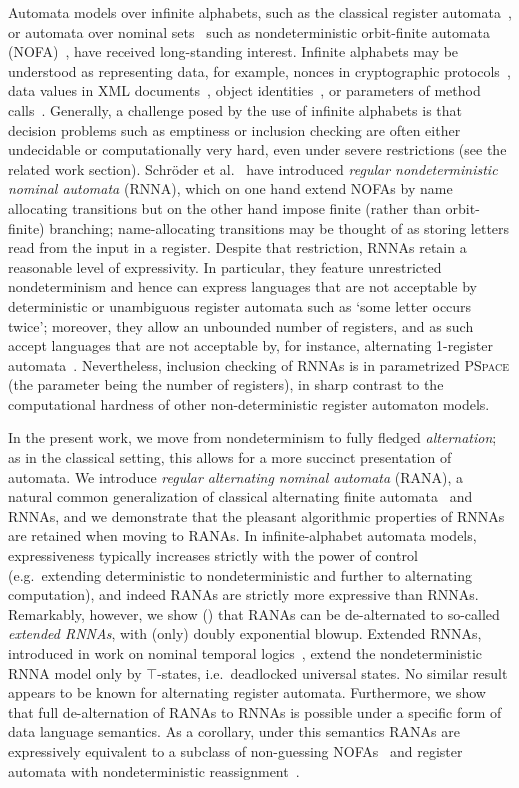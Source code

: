 \documentclass[10pt, final, conference, a4paper, twocolumn]{IEEEtran}
\newcommand{\PSPACE}{\textsc{PSpace}\xspace}
\begin{document}
Automata models over infinite alphabets, such as the classical register
automata~\cite{KaminskiFrancez94}, or automata over nominal sets~\cite{Pitts2013} such as
nondeterministic orbit-finite automata (NOFA)~\cite{BojanczykEA14}, have received long-standing
interest.  Infinite alphabets may be understood as representing data, for example, nonces in
cryptographic protocols~\cite{KurtzEA07}, data values in XML documents~\cite{NevenEA04}, object
identities~\cite{GrigoreEA13}, or parameters of method calls~\cite{HowarEA19}.  Generally, a
challenge posed by the use of infinite alphabets is that decision problems such as emptiness or
inclusion checking are often either undecidable or computationally very hard, even under severe
restrictions (see the related work section).  Schröder et al.~\cite{skmw17} have introduced
\emph{regular nondeterministic nominal automata} (RNNA), which on one hand extend NOFAs by name
allocating transitions but on the other hand impose finite (rather than orbit-finite)
branching; name-allocating transitions may be thought of as storing letters read from the input
in a register. Despite that restriction, RNNAs retain a reasonable level of expressivity. In
particular, they feature unrestricted nondeterminism and hence can express languages that are
not acceptable by deterministic or unambiguous register automata such as `some letter occurs
twice'; moreover, they allow an unbounded number of registers, and as such accept languages
that are not acceptable by, for instance, alternating 1-register
automata~\cite{skmw17}. Nevertheless, inclusion checking of RNNAs is in parametrized \PSPACE
(the parameter being the number of registers), in sharp contrast to the computational hardness
of other non-deterministic register automaton models.

In the present work, we move from nondeterminism to fully fledged \emph{alternation}; as in the
classical setting, this allows for a more succinct presentation of automata. We introduce
\emph{regular alternating nominal automata} (RANA), a natural common generalization of
classical alternating finite automata~\cite{cks81} and RNNAs, and we demonstrate that the
pleasant algorithmic properties of RNNAs are retained when moving to RANAs. In
infinite-alphabet automata models, expressiveness typically increases strictly with the power
of control (e.g.~extending deterministic to nondeterministic and further to alternating
computation), and indeed RANAs are strictly more expressive than RNNAs. Remarkably, however, we
show () that RANAs can be de-alternated to so-called \emph{extended RNNAs},
with (only) doubly exponential blowup. Extended RNNAs, introduced in work on nominal temporal
logics~\cite{hms21}, extend the nondeterministic RNNA model only by $\top$-states,
i.e.~deadlocked universal states. No similar result appears to be known for alternating
register automata. Furthermore, we show that full de-alternation of RANAs to RNNAs is possible
under a specific form of data language semantics. As a corollary, under this semantics RANAs
are expressively equivalent to a subclass of non-guessing NOFAs~\cite{BojanczykEA14} and
register automata with nondeterministic reassignment~\cite{BojanczykEA14,KaminskiZeitlin10}.
\end{document}
